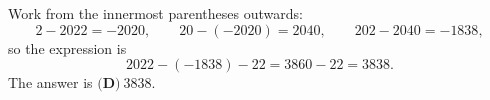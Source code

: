 Work from the innermost parentheses outwards:
\[2-2022=-2020,\qquad 20-(-2020)=2040,\qquad 202-2040=-1838,\]
so the expression is
\[2022-(-1838)-22=3860-22=3838.\]
The answer is $\boxed{\textbf{(D)}~3838}$.
